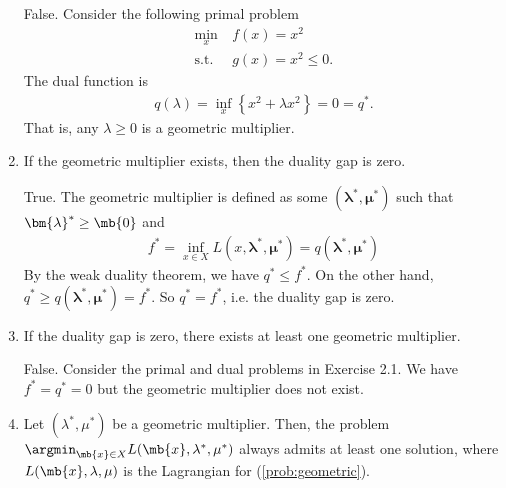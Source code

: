 \begin{exercise}
\begin{enumerate}
            \begin{solution}
                False. Consider the following primal problem
                \begin{align*}
                    \min_x\       & f(x) = x^2        \\
                    \text{s.t.}\  & g(x) = x^2 \le 0.
                \end{align*}
                The dual function is
                \begin{align*}
                    q(\lambda) = \inf_{x} \left\{ x^2 + \lambda x^2 \right\} = 0 = q^*.
                \end{align*}
                That is, any $\lambda \ge 0$ is a geometric multiplier.
                \qedhere
            \end{solution}


        \item If the geometric multiplier exists, then the duality gap is zero.

            \begin{solution}
                True. The geometric multiplier is defined as some $(\bm{\lambda}^*, \bm{\mu}^*)$ such that $\bm{\lambda}^* \ge \mb{0}$ and
                \begin{align*}
                    f^* = \inf_{x\in X} L(x, \bm{\lambda}^*, \bm{\mu}^*) = q(\bm{\lambda}^*, \bm{\mu}^*)
                \end{align*}
                By the weak duality theorem, we have $q^* \le f^*$. On the other hand, $q^* \ge q(\bm{\lambda}^*, \bm{\mu}^*) = f^*$. So $q^* = f^*$, i.e. the duality gap is zero.
                \qedhere
            \end{solution}

        \item If the duality gap is zero, there exists at least one geometric multiplier.

            \begin{solution}
                False. Consider the primal and dual problems in Exercise 2.1. We have $f^* = q^* = 0$ but the geometric multiplier does not exist.
                \qedhere
            \end{solution}

        \item Let $(\lambda^*,\mu^*)$ be a geometric multiplier. Then, the problem $\argmin_{\mb{x}\in X} L(\mb{x}, \lambda^*,\mu^*)$ always admits at least one solution, where $L(\mb{x}, \lambda, \mu)$ is the Lagrangian for (\ref{prob:geometric}).


\end{enumerate}
\end{exercise}
